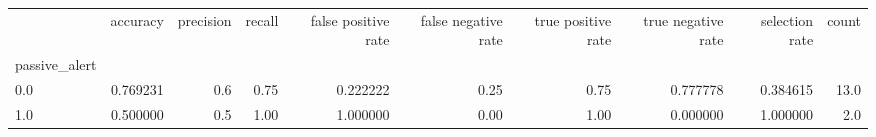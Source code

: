 \begin{tabular}{lrrrrrrrrr}
\toprule
{} &  accuracy &  precision &  recall &  false positive rate &  false negative rate &  true positive rate &  true negative rate &  selection rate &  count \\
passive\_alert &           &            &         &                      &                      &                     &                     &                 &        \\
\midrule
0.0           &  0.769231 &        0.6 &    0.75 &             0.222222 &                 0.25 &                0.75 &            0.777778 &        0.384615 &   13.0 \\
1.0           &  0.500000 &        0.5 &    1.00 &             1.000000 &                 0.00 &                1.00 &            0.000000 &        1.000000 &    2.0 \\
\bottomrule
\end{tabular}
